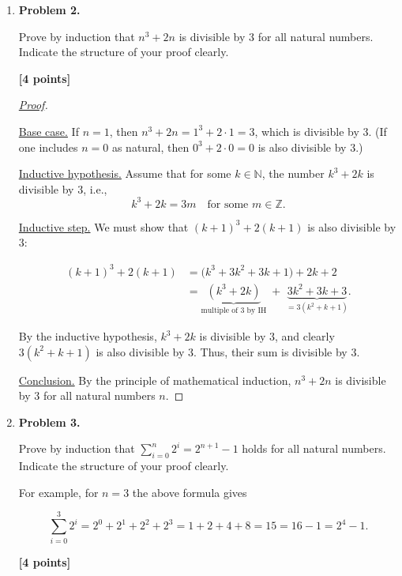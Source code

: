 \documentclass[11pt]{article}
\begin{document}
\begin{enumerate}
\newpage

\item \textbf{Problem 2.}

Prove by induction that \(n^3 + 2n\) is divisible by \(3\) for all natural numbers. Indicate the structure of your proof clearly.

\begin{flushright}
\textbf{[4 points]}
\end{flushright}

\begin{proof}[\underline{Proof}]
\

\underline{Base case.} If $n=1$, then \(n^3+2n = 1^3 + 2\cdot 1 = 3\), which is divisible by $3$. (If one includes $n=0$ as natural, then $0^3 + 2\cdot 0 = 0$ is also divisible by $3$.)

\underline{Inductive hypothesis.} Assume that for some $k \in \mathbb{N}$, the number $k^3 + 2k$ is divisible by $3$, i.e.,
\[
k^3 + 2k = 3m \quad \text{for some } m \in \mathbb{Z}.
\]

\underline{Inductive step.} We must show that $(k+1)^3 + 2(k+1)$ is also divisible by $3$:

\[
\begin{aligned}
(k+1)^3+2(k+1)
&= \big(k^3+3k^2+3k+1\big)+2k+2 \\
&= \underbrace{(k^3+2k)}_{\text{multiple of }3 \text{ by IH}} \;+\; \underbrace{3k^2+3k+3}_{=3(k^2+k+1)}.
\end{aligned}
\]

By the inductive hypothesis, $k^3+2k$ is divisible by $3$, and clearly $3(k^2+k+1)$ is also divisible by $3$.  
Thus, their sum is divisible by $3$.

\underline{Conclusion.} By the principle of mathematical induction, $n^3 + 2n$ is divisible by $3$ for all natural numbers $n$.

\end{proof}

\item \textbf{Problem 3.}

Prove by induction that \(\displaystyle\sum_{i=0}^{n} 2^i = 2^{n+1} - 1\) holds for all natural numbers. Indicate the structure of your proof clearly.

For example, for \(n=3\) the above formula gives

\[
\sum_{i=0}^{3} 2^i = 2^0 + 2^1 + 2^2 + 2^3 = 1 + 2 + 4 + 8 = 15 = 16 - 1 = 2^4 - 1.
\]

\begin{flushright}
\textbf{[4 points]}
\end{flushright}


\end{enumerate}
\end{document}

